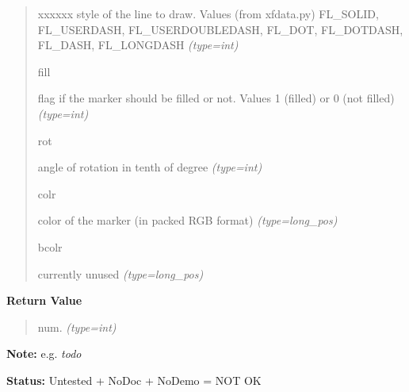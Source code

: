 \begin{boxedminipage}{\funcwidth}
\begin{quote}
\begin{Ventry}{xxxxxx}
style of the line to draw. Values (from xfdata.py) FL\_SOLID,
FL\_USERDASH, FL\_USERDOUBLEDASH, FL\_DOT, FL\_DOTDASH, FL\_DASH,
FL\_LONGDASH
            {\it (type=int)}

          \item[fill]


flag if the marker should be filled or not. Values 1 (filled) or 0
(not filled)
            {\it (type=int)}

          \item[rot]


angle of rotation in tenth of degree
            {\it (type=int)}

          \item[colr]


color of the marker (in packed RGB format)
            {\it (type=long\_pos)}

          \item[bcolr]


currently unused
            {\it (type=long\_pos)}

        \end{Ventry}

      \end{quote}

      \textbf{Return Value}
    \vspace{-1ex}

      \begin{quote}

num.
      {\it (type=int)}

      \end{quote}

\textbf{Note:} 
e.g. \emph{todo}


\textbf{Status:} 
Untested + NoDoc + NoDemo = NOT OK


    \end{boxedminipage}

    \label{xformslib:flflimage:flimage_add_marker_struct}

    \vspace{0.5ex}

